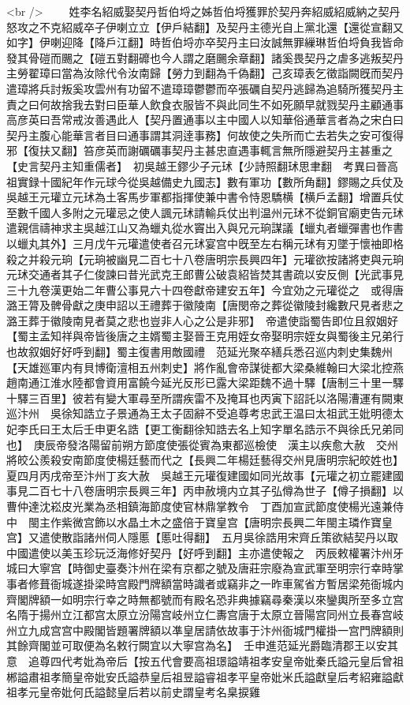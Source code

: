 <br />
　　姓李名紹威娶契丹哲伯埒之姊哲伯埒獲罪於契丹奔紹威紹威納之契丹怒攻之不克紹威卒子伊喇立立【伊戶結翻】及契丹主德光自上黨北還【還從宣翻又如字】伊喇迎降【降戶江翻】時哲伯埒亦卒契丹主曰汝誠無罪繅琳哲伯埒負我皆命發其骨磑而颺之【磑五對翻䃺也今人謂之磨颺余章翻】諸奚畏契丹之虐多逃叛契丹主勞翟璋曰當為汝除代令汝南歸【勞力到翻為千偽翻】己亥璋表乞徵詣闕旣而契丹遣璋將兵討叛奚攻雲州有功留不遣璋璋鬱鬱而卒張礪自契丹逃歸為追騎所獲契丹主責之曰何故捨我去對曰臣華人飲食衣服皆不與此同生不如死願早就戮契丹主顧通事高彦英曰吾常戒汝善遇此人【契丹置通事以主中國人以知華俗通華言者為之宋白曰契丹主腹心能華言者目曰通事謂其洞逹事務】何故使之失所而亡去若失之安可復得邪【復扶又翻】笞彦英而謝礪礪事契丹主甚忠直遇事輒言無所隱避契丹主甚重之【史言契丹主知重儒者】　初吳越王鏐少子元㺷【少詩照翻㺷思聿翻　考異曰晉高祖實録十國紀年作元球今從吳越備史九國志】數有軍功【數所角翻】鏐賜之兵仗及吳越王元瓘立元㺷為土客馬步軍都指揮使兼中書令恃恩驕横【横戶孟翻】增置兵仗至數千國人多附之元瓘忌之使人諷元㺷請輸兵仗出判温州元㺷不從銅官廟吏告元㺷遣親信禱神求主吳越江山又為蠟丸從水竇出入與兄元珦謀議【蠟丸者蠟彈書也作書以蠟丸其外】三月戊午元瓘遣使者召元㺷宴宫中旣至左右稱元㺷有刃墜于懷䄂即格殺之并殺元珦【元珦被幽見二百七十八卷唐明宗長興四年】元瓘欲按諸將吏與元珦元㺷交通者其子仁俊諫曰昔光武克王郎曹公破袁紹皆焚其書疏以安反側【光武事見三十九卷漢更始二年曹公事見六十四卷獻帝建安五年】今宜効之元瓘從之　或得唐潞王膂及髀骨獻之庚申詔以王禮葬于徽陵南【唐閔帝之葬從徽陵封纔數尺見者悲之潞王葬于徽陵南見者莫之悲也豈非人心之公是非邪】　帝遣使詣蜀告即位且叙姻好【蜀主孟知祥與帝皆後唐之主婿蜀主娶晉王克用姪女帝娶明宗姪女與蜀後主兄弟行也故叙姻好好呼到翻】蜀主復書用敵國禮　范延光聚卒繕兵悉召巡内刺史集魏州【天雄廵軍内有貝博衛澶相五州刺史】將作亂會帝謀徙都大梁桑維翰曰大梁北控燕趙南通江淮水陸都會資用富饒今延光反形已露大梁距魏不過十驛【唐制三十里一驛十驛三百里】彼若有變大軍尋至所謂疾雷不及掩耳也丙寅下詔託以洛陽漕運有闕東巡汴州　吳徐知誥立子景通為王太子固辭不受追尊考忠武王温曰太祖武王妣明德太妃李氏曰王太后壬申更名誥【更工衡翻徐知誥去名上知字單名誥示不與徐氏兄弟同也】　庚辰帝發洛陽留前朔方節度使張從賓為東都巡檢使　漢主以疾愈大赦　交州將皎公羨殺安南節度使楊廷藝而代之【長興二年楊廷藝得交州見唐明宗紀皎姓也】　夏四月丙戌帝至汴州丁亥大赦　吳越王元瓘復建國如同光故事【元瓘之初立罷建國事見二百七十八卷唐明宗長興三年】丙申赦境内立其子弘僔為世子【僔子損翻】以曹仲達沈崧皮光業為丞相鎮海節度使官林鼎掌教令　丁酉加宣武節度使楊光遠兼侍中　閩主作紫微宫飾以水晶土木之盛倍于寶皇宫【唐明宗長興二年閩主璘作寶皇宫】又遣使散詣諸州伺人隱慝【慝吐得翻】　五月吳徐誥用宋齊丘策欲結契丹以取中國遣使以美玉珍玩泛海修好契丹【好呼到翻】主亦遣使報之　丙辰敕權署汴州牙城曰大寧宫【時御史臺奏汴州在梁有京都之號及唐莊宗廢為宣武軍至明宗行幸時掌事者修葺衙城遂掛梁時宫殿門牌額當時識者或竊非之一昨車駕省方暫居梁苑衙城内齊閣牌額一如明宗行幸之時無都號而有殿名恐非典據竊尋秦漢以來鑾輿所至多立宫名隋于揚州立江都宫太原立汾陽宫岐州立仁夀宫唐于太原立晉陽宫同州立長春宫岐州立九成宫宫中殿閣皆題署牌額以凖皇居請依故事于汴州衙城門權掛一宫門牌額則其餘齊閣並可取便為名敕行闕宜以大寧宫為名】　壬申進范延光爵臨清郡王以安其意　追尊四代考妣為帝后【按五代會要高祖璟謚靖祖孝安皇帝妣秦氏謚元皇后曾祖郴謚肅祖孝簡皇帝妣安氏謚恭皇后祖昱謚睿祖孝平皇帝妣米氏謚獻皇后考紹雍謚獻祖孝元皇帝妣何氏謚懿皇后若以前史謂皇考名臬捩雞